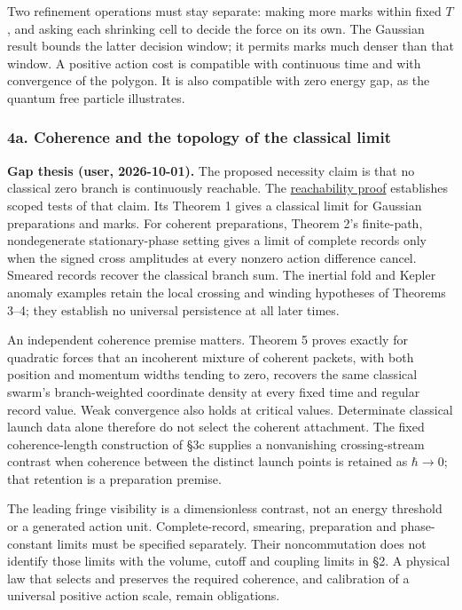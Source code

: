 \documentclass[11pt,a4paper]{article}
\begin{document}
Two refinement operations must stay separate: making more marks within
fixed \(T\), and asking each shrinking cell to decide the force on its
own. The Gaussian result bounds the latter decision window; it permits
marks much denser than that window. A positive action cost is compatible
with continuous time and with convergence of the polygon. It is also
compatible with zero energy gap, as the quantum free particle
illustrates.

\hypertarget{a.-coherence-and-the-topology-of-the-classical-limit}{%
\subsubsection{4a. Coherence and the topology of the classical
limit}\label{a.-coherence-and-the-topology-of-the-classical-limit}}

\textbf{Gap thesis (user, 2026-10-01).} The proposed necessity claim is
that no classical zero branch is continuously reachable. The
\href{zero-branch-reachability.md}{reachability proof} establishes
scoped tests of that claim. Its Theorem 1 gives a classical limit for
Gaussian preparations and marks. For coherent preparations, Theorem 2's
finite-path, nondegenerate stationary-phase setting gives a limit of
complete records only when the signed cross amplitudes at every nonzero
action difference cancel. Smeared records recover the classical branch
sum. The inertial fold and Kepler anomaly examples retain the local
crossing and winding hypotheses of Theorems 3--4; they establish no
universal persistence at all later times.

An independent coherence premise matters. Theorem 5 proves exactly for
quadratic forces that an incoherent mixture of coherent packets, with
both position and momentum widths tending to zero, recovers the same
classical swarm's branch-weighted coordinate density at every fixed time
and regular record value. Weak convergence also holds at critical
values. Determinate classical launch data alone therefore do not select
the coherent attachment. The fixed coherence-length construction of §3c
supplies a nonvanishing crossing-stream contrast when coherence between
the distinct launch points is retained as \(\hbar\to0\); that retention
is a preparation premise.

The leading fringe visibility is a dimensionless contrast, not an energy
threshold or a generated action unit. Complete-record, smearing,
preparation and phase-constant limits must be specified separately.
Their noncommutation does not identify those limits with the volume,
cutoff and coupling limits in §2. A physical law that selects and
preserves the required coherence, and calibration of a universal
positive action scale, remain obligations.
\end{document}
